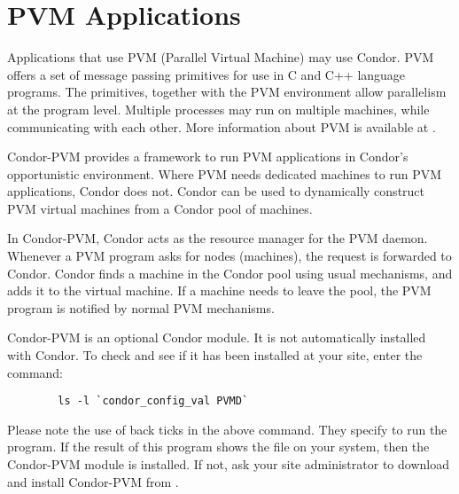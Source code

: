 \section{\label{sec:PVM}PVM Applications}

\newcommand{\func}[1]{\texttt{#1}}

Applications that use PVM (Parallel Virtual Machine) may use
Condor.
PVM offers a set of message passing primitives for use in
C and C++ language programs.
The primitives, together with the PVM environment
allow parallelism at the program level.
Multiple processes
may run on multiple machines,
while communicating with each other.
More information about PVM is available at 
.

Condor-PVM provides a framework to run PVM applications
in Condor's opportunistic environment.
Where PVM needs dedicated machines
to run PVM applications, Condor does not.
Condor can be used to dynamically 
construct PVM virtual machines from a Condor pool of machines.

In Condor-PVM, Condor acts as the
resource manager for the PVM daemon.  Whenever a PVM program asks
for nodes (machines), the request is forwarded to Condor.
Condor finds a machine in the Condor pool using usual mechanisms,
and adds it to the virtual machine.
If a machine needs to leave the pool, the
PVM program is notified by normal PVM mechanisms.


\Note Condor-PVM is an optional Condor module.  It is not
automatically installed with Condor. To check and see if
it has been installed at your site, enter the command:
\begin{verbatim}
        ls -l `condor_config_val PVMD`
\end{verbatim}
Please note the use of back ticks in the above command.
They specify to run the  program.
If the result of this program shows the
file  on your system, then the Condor-PVM module
is installed.
If not,
ask your site administrator to download and install Condor-PVM from
.

